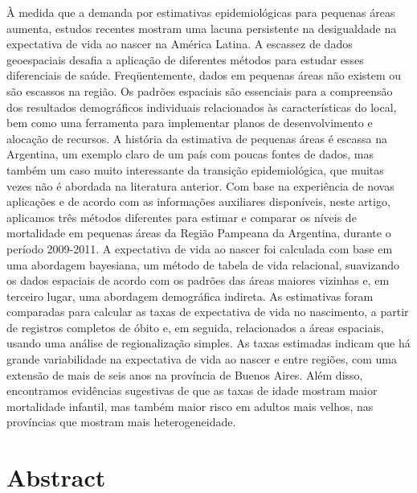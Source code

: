 \documentclass[12pt,]{article}
\begin{document}
À medida que a demanda por estimativas epidemiológicas para pequenas
áreas aumenta, estudos recentes mostram uma lacuna persistente na
desigualdade na expectativa de vida ao nascer na América Latina. A
escassez de dados geoespaciais desafia a aplicação de diferentes métodos
para estudar esses diferenciais de saúde. Freqüentemente, dados em
pequenas áreas não existem ou são escassos na região. Os padrões
espaciais são essenciais para a compreensão dos resultados demográficos
individuais relacionados às características do local, bem como uma
ferramenta para implementar planos de desenvolvimento e alocação de
recursos. A história da estimativa de pequenas áreas é escassa na
Argentina, um exemplo claro de um país com poucas fontes de dados, mas
também um caso muito interessante da transição epidemiológica, que
muitas vezes não é abordada na literatura anterior. Com base na
experiência de novas aplicações e de acordo com as informações
auxiliares disponíveis, neste artigo, aplicamos três métodos diferentes
para estimar e comparar os níveis de mortalidade em pequenas áreas da
Região Pampeana da Argentina, durante o período 2009-2011. A expectativa
de vida ao nascer foi calculada com base em uma abordagem bayesiana, um
método de tabela de vida relacional, suavizando os dados espaciais de
acordo com os padrões das áreas maiores vizinhas e, em terceiro lugar,
uma abordagem demográfica indireta. As estimativas foram comparadas para
calcular as taxas de expectativa de vida no nascimento, a partir de
registros completos de óbito e, em seguida, relacionados a áreas
espaciais, usando uma análise de regionalização simples. As taxas
estimadas indicam que há grande variabilidade na expectativa de vida ao
nascer e entre regiões, com uma extensão de mais de seis anos na
província de Buenos Aires. Além disso, encontramos evidências sugestivas
de que as taxas de idade mostram maior mortalidade infantil, mas também
maior risco em adultos mais velhos, nas províncias que mostram mais
heterogeneidade.

\hypertarget{abstract}{%
\section{\texorpdfstring{\textbf{Abstract}}{Abstract}}\label{abstract}}
\end{document}
